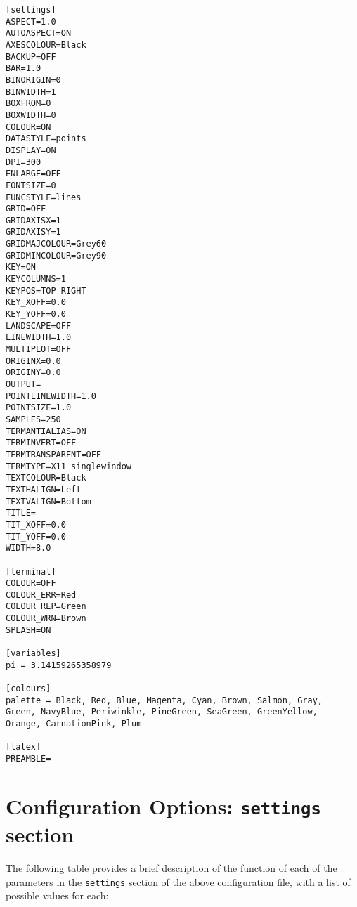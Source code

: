 \begin{verbatim}
[settings]
ASPECT=1.0
AUTOASPECT=ON
AXESCOLOUR=Black
BACKUP=OFF
BAR=1.0
BINORIGIN=0
BINWIDTH=1
BOXFROM=0
BOXWIDTH=0
COLOUR=ON
DATASTYLE=points
DISPLAY=ON
DPI=300
ENLARGE=OFF
FONTSIZE=0
FUNCSTYLE=lines
GRID=OFF
GRIDAXISX=1
GRIDAXISY=1
GRIDMAJCOLOUR=Grey60
GRIDMINCOLOUR=Grey90
KEY=ON
KEYCOLUMNS=1
KEYPOS=TOP RIGHT
KEY_XOFF=0.0
KEY_YOFF=0.0
LANDSCAPE=OFF
LINEWIDTH=1.0
MULTIPLOT=OFF
ORIGINX=0.0
ORIGINY=0.0
OUTPUT=
POINTLINEWIDTH=1.0
POINTSIZE=1.0 
SAMPLES=250
TERMANTIALIAS=ON
TERMINVERT=OFF
TERMTRANSPARENT=OFF
TERMTYPE=X11_singlewindow
TEXTCOLOUR=Black
TEXTHALIGN=Left
TEXTVALIGN=Bottom
TITLE=
TIT_XOFF=0.0
TIT_YOFF=0.0
WIDTH=8.0

[terminal]
COLOUR=OFF
COLOUR_ERR=Red
COLOUR_REP=Green
COLOUR_WRN=Brown
SPLASH=ON

[variables]
pi = 3.14159265358979

[colours]
palette = Black, Red, Blue, Magenta, Cyan, Brown, Salmon, Gray,
Green, NavyBlue, Periwinkle, PineGreen, SeaGreen, GreenYellow,
Orange, CarnationPink, Plum

[latex]
PREAMBLE=
\end{verbatim}

\section{Configuration Options: {\tt settings} section}
\label{configfile_settings}

The following table provides a brief description of the function of each of the
parameters in the {\tt settings} section of the above configuration file,
with a list of possible values for each:

